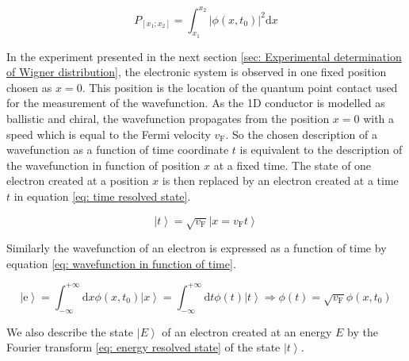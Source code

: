 \begin{equation}
P_{\left[x_{1}; x_{2}\right]} = \int_{x_{1}}^{x_{2}}|\phi\left(x,t_{0}\right)|^{2}\mathrm{d}x \label{eq: probability presence}
\end{equation}

In the experiment presented in the next section \ref{sec: Experimental determination of Wigner distribution}, the electronic system is observed in one fixed position chosen as $x=0$.
This position is the location of the quantum point contact used for the measurement of the wavefunction.
As the 1D conductor is modelled as ballistic and chiral, the wavefunction propagates from the position $x = 0$ with a speed which is equal to the Fermi velocity $v_{\mathrm{F}}$.
So the chosen description of a wavefunction as a function of time coordinate $t$ is equivalent to the description of the wavefunction in function of position $x$ at a fixed time.
The state of one electron created at a position $x$ is then replaced by an electron created at a time $t$ in equation \eqref{eq: time resolved state}.


\begin{equation}
\left|t\right> = \sqrt{v_{\mathrm{F}}}\left|x = v_{\mathrm{F}}t\right> \label{eq: time resolved state}
\end{equation}

Similarly the wavefunction of an electron is expressed as a function of time by equation \eqref{eq: wavefunction in function of time}.

\begin{equation}
\left|\mathrm{e}\right> = \int_{-\infty}^{+\infty} \mathrm{d}x \phi\left(x,t_{0}\right)\left|x\right> = \int_{-\infty}^{+\infty} \mathrm{d}t \phi\left(t\right)\left|t\right> \Rightarrow \phi\left(t\right) = \sqrt{v_{\mathrm{F}}}\phi\left(x,t_{0}\right) \label{eq: wavefunction in function of time}
\end{equation}

We also describe the state $\left|E\right>$ of an electron created at an energy $E$ by the Fourier transform \eqref{eq: energy resolved state} of the state $\left|t\right>$.

